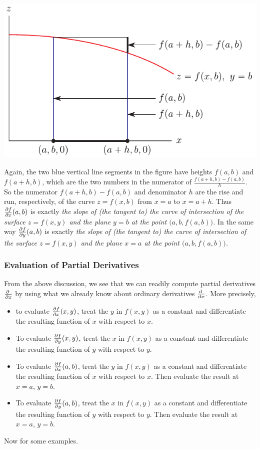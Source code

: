 \begin{remark}
{\begin{efig}
\begin{center}
   \includegraphics{xderivSide.pdf}
\end{center}
\end{efig}
}
 Again, the two blue vertical line segments 
in the figure have heights $f(a,b)$ and $f(a+h,b)$, which are the two 
numbers in the numerator of $\frac{f(a+h,b) - f(a,b)}{h}$. So
the numerator $f(a+h,b) - f(a,b)$ and denominator $h$ are the rise and run,
respectively, of the curve $z=f(x,b)$ from $x=a$ to $x=a+h$. Thus
$\pdiff{f}{x}(a,b)$ is exactly 
\emph{the slope of (the tangent to) the curve of intersection of the surface 
$z=f(x,y)$ and the plane $y=b$ at the point $\big(a,b, f(a,b)\big)$.}
In the same way
$\pdiff{f}{y}(a,b)$ is exactly 
\emph{the slope of (the tangent to) the curve of intersection of the surface 
$z=f(x,y)$ and the plane $x=a$ at the point $\big(a,b, f(a,b)\big)$.}
\end{remark}

\subsubsection{Evaluation of Partial Derivatives}\label{sec eval partials}
From the above discussion, we see that we can readily compute partial 
derivatives $\pdiff{}{x}$ by using what we already know about ordinary
derivatives $\diff{}{x}$. More precisely, 

\begin{itemize}
\item
to evaluate $\pdiff{f}{x}(x,y)$, treat the $y$ in $f(x,y)$ as a constant
and differentiate the resulting function of $x$ with respect to $x$.
\item
To evaluate $\pdiff{f}{y}(x,y)$, treat the $x$ in $f(x,y)$ as a constant
and differentiate the resulting function of $y$ with respect to $y$.
\item
To evaluate $\pdiff{f}{x}(a,b)$, treat the $y$ in $f(x,y)$ as a constant
and differentiate the resulting function of $x$ with respect to $x$.
Then evaluate the result at $x=a$, $y=b$.
\item
To evaluate $\pdiff{f}{y}(a,b)$, treat the $x$ in $f(x,y)$ as a constant
and differentiate the resulting function of $y$ with respect to $y$.
Then evaluate the result at $x=a$, $y=b$.
\end{itemize}
\noindent
Now for some examples.

